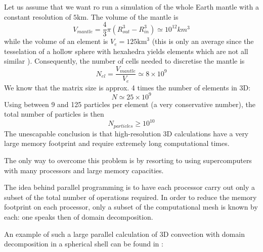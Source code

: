 
Let us assume that we want ro run a simulation of the whole Earth mantle
with a constant resolution of $5\text{km}$. The volume of the mantle is
\[
V_{mantle}=\frac{4}{3}\pi (R_{out}^3-R_{in}^3) \simeq  10^{12}  km^3
\]
while the volume of an element is $V_{e} = 125 \text{km}^3$ (this is 
only an average since the tesselation of a hollow sphere with 
hexahedra yields elements which are not all similar \cite{thie18}).
Consequently, the number of cells needed to discretise the mantle
is 
\[
N_{el}=\frac{V_{mantle}}{V_{e}}\simeq 8\times 10^9
\]
We know that the matrix size is approx. 4 times the number of elements in 3D:
\[
N\simeq 25 \times 10^9
\]
Using between 9 and 125 particles per element (a very conservative number),
the total number of particles is then
\[
N_{particles}  \geq 10^{10}
\]
The unescapable conclusion is that high-resolution 3D 
calculations 
 have a very large memory footprint and require extremely long computational times.

The only way to overcome this problem is by resorting to 
using supercomputers with many processors and large memory capacities.

The idea behind parallel programming is to have each processor carry out 
only a subset of the total number of operations required. In order to reduce 
the memory footprint on each processor, only a subset of the computational
mesh is known by each: one speaks then of domain decomposition.

An example of such a large parallel calculation of 3D convection with 
domain decomposition in a spherical shell can be found in \cite{krhb12}:

